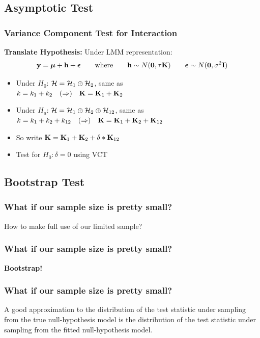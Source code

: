 \documentclass{beamer}
\begin{document}
\subsection{Asymptotic Test}
\begin{frame}
\frametitle{Variance Component Test for Interaction}
\label{vct}
\textbf{Translate Hypothesis:}
Under LMM representation:
\begin{align*}
{\bf y} = \boldsymbol{\mu} + {\bf h} + \boldsymbol{\epsilon} 
\qquad \mbox{where} \qquad
{\bf h} \sim N({\bf 0}, \tau {\bf K}) \qquad 
\boldsymbol{\epsilon} \sim N({\bf 0}, \sigma^2 {\bf I})
\end{align*} 
\begin{itemize}[<+->]
\item Under $H_0$: ${\cal H} = {\cal H}_1 \oplus {\cal H}_2$,  same as \\
$k = k_1 + k_2 \quad (\Rightarrow) \quad 
{\bf K} = {\bf K}_1 + {\bf K}_2$
\item Under $H_a$: ${\cal H} = {\cal H}_1 \oplus {\cal H}_2 \oplus {\cal H}_{12}$,  same as\\
$k = k_1 + k_2 + k_{12} \quad (\Rightarrow) \quad 
{\bf K} = {\bf K}_1 + {\bf K}_2 + {\bf K}_{12}$
\item So write ${\bf K} = {\bf K}_1 + {\bf K}_2 + \delta *{\bf K}_{12}$
\item Test for $H_0: \delta = 0$ using VCT  \hyperlink{vct_detail}{}
\end{itemize}
\end{frame}


\subsection{Bootstrap Test}
\begin{frame}
\frametitle{What if our sample size is pretty small?}
\begin{center}
How to make full use of our limited sample?
\end{center}
\end{frame}

\begin{frame}
\frametitle{What if our sample size is pretty small?}
\begin{center}
\textbf{Bootstrap!}
\end{center}
\end{frame}

\begin{frame}
\frametitle{What if our sample size is pretty small?}
A good approximation to the distribution of the test statistic under sampling from the true null-hypothesis model is the distribution of the test statistic under sampling from the fitted null-hypothesis model.
\end{frame}
\end{document}
